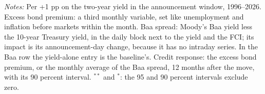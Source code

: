 \begin{table}[tp]\centering\small
\caption{Credit and the Response ($r^*$-Gap Yield; 12 Lags)}\label{tab:credit}
\begin{flushleft}\footnotesize\textit{Notes:} Per +1 pp on the two-year yield in the announcement window, 1996--2026. Excess bond premium: a third monthly variable, set like unemployment and inflation before markets within the month. Baa spread: Moody's Baa yield less the 10-year Treasury yield, in the daily block next to the yield and the FCI; its impact is its announcement-day change, because it has no intraday series. In the Baa row the yield-alone entry is the baseline's. Credit response: the excess bond premium, or the monthly average of the Baa spread, 12 months after the move, with its 90 percent interval. $^{**}$ and $^{*}$: the 95 and 90 percent intervals exclude zero.\end{flushleft}
\end{table}
